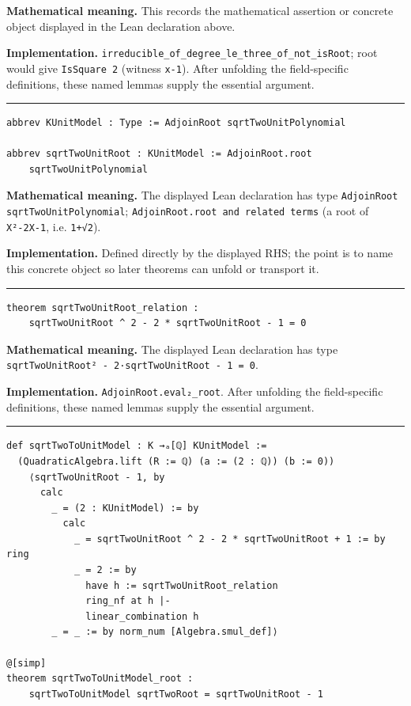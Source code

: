 \documentclass[UTF8,a4paper,11pt,fontset=fandol]{ctexart}
\theoremstyle{definition}
\newcommand{\statementsep}{\par\medskip\hrule\medskip}
\begin{document}
\noindent\textbf{Mathematical meaning.} This records the mathematical assertion or concrete object displayed in the Lean declaration above.\par
\noindent\textbf{Implementation.} \texttt{irreducible\_\allowbreak{}of\_\allowbreak{}degree\_\allowbreak{}le\_\allowbreak{}three\_\allowbreak{}of\_\allowbreak{}not\_\allowbreak{}isRoot}; root would give \texttt{IsSquare 2} (witness \texttt{x-1}). After unfolding the field-specific definitions, these named lemmas supply the essential argument.\par
\statementsep
\begin{verbatim}
abbrev KUnitModel : Type := AdjoinRoot sqrtTwoUnitPolynomial

abbrev sqrtTwoUnitRoot : KUnitModel := AdjoinRoot.root
    sqrtTwoUnitPolynomial
\end{verbatim}
\noindent\textbf{Mathematical meaning.} The displayed Lean declaration has type \texttt{AdjoinRoot sqrtTwoUnitPolynomial}; \texttt{AdjoinRoot.\allowbreak{}root and related terms} (a root of \texttt{X²-2X-1}, i.e. \texttt{1+√2}).\par
\noindent\textbf{Implementation.} Defined directly by the displayed RHS; the point is to name this concrete object so later theorems can unfold or transport it.\par
\statementsep
\begin{verbatim}
theorem sqrtTwoUnitRoot_relation :
    sqrtTwoUnitRoot ^ 2 - 2 * sqrtTwoUnitRoot - 1 = 0
\end{verbatim}
\noindent\textbf{Mathematical meaning.} The displayed Lean declaration has type \texttt{sqrtTwoUnitRoot² - 2·sqrtTwoUnitRoot - 1 = 0}.\par
\noindent\textbf{Implementation.} \texttt{AdjoinRoot.\allowbreak{}eval₂\_\allowbreak{}root}. After unfolding the field-specific definitions, these named lemmas supply the essential argument.\par
\statementsep
\begin{verbatim}
def sqrtTwoToUnitModel : K →ₐ[ℚ] KUnitModel :=
  (QuadraticAlgebra.lift (R := ℚ) (a := (2 : ℚ)) (b := 0))
    ⟨sqrtTwoUnitRoot - 1, by
      calc
        _ = (2 : KUnitModel) := by
          calc
            _ = sqrtTwoUnitRoot ^ 2 - 2 * sqrtTwoUnitRoot + 1 := by ring
            _ = 2 := by
              have h := sqrtTwoUnitRoot_relation
              ring_nf at h |-
              linear_combination h
        _ = _ := by norm_num [Algebra.smul_def]⟩

@[simp]
theorem sqrtTwoToUnitModel_root :
    sqrtTwoToUnitModel sqrtTwoRoot = sqrtTwoUnitRoot - 1
\end{verbatim}
\end{document}
